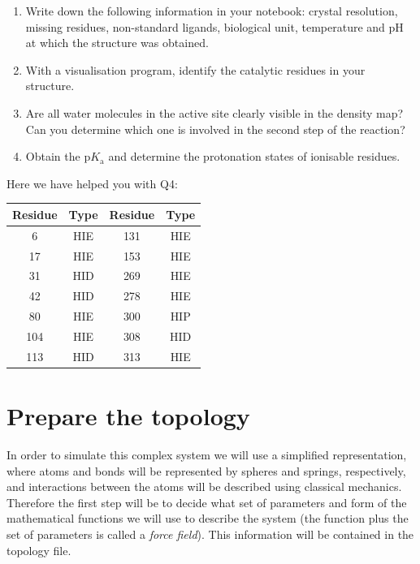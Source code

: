 \documentclass[10pt]{article}
\begin{document}
\begin{summary}
    \begin{enumerate}[leftmargin=0.6cm]
        \renewcommand{\labelenumi}{Q\arabic{enumi}.}
        \item Write down the following information in your notebook: crystal resolution, missing residues, non-standard ligands, biological unit, temperature and pH at which the structure was obtained.
        \item With a visualisation program, identify the catalytic residues in your structure.
        \item Are all water molecules in the active site clearly visible in the density map? Can you determine which one is involved in the second step of the reaction?
        \item Obtain the \(\mathrm pK_\mathrm{a}\) and determine the protonation states of ionisable residues. 
    \end{enumerate}
\end{summary}

Here we have helped you with Q4:

\begin{center}
    \begin{tabular}{cc|cc}
        \toprule
        Residue & Type & Residue & Type \\
        \midrule
        6       & HIE  & 131     & HIE  \\
        17      & HIE  & 153     & HIE  \\
        31      & HID  & 269     & HIE  \\
        42      & HID  & 278     & HIE  \\
        80      & HIE  & 300     & HIP  \\
        104     & HIE  & 308     & HID  \\
        113     & HID  & 313     & HIE  \\
        \bottomrule
    \end{tabular}
\end{center}


\section{Prepare the topology}

In order to simulate this complex system we will use a simplified representation, where atoms and bonds will be represented by spheres and springs, respectively, and interactions between the atoms will be described using classical mechanics. Therefore the first step will be to decide what set of parameters and form of the mathematical functions we will use to describe the system (the function plus the set of parameters is called a \textit{force field}). This information will be contained in the topology file. 
\end{document}
